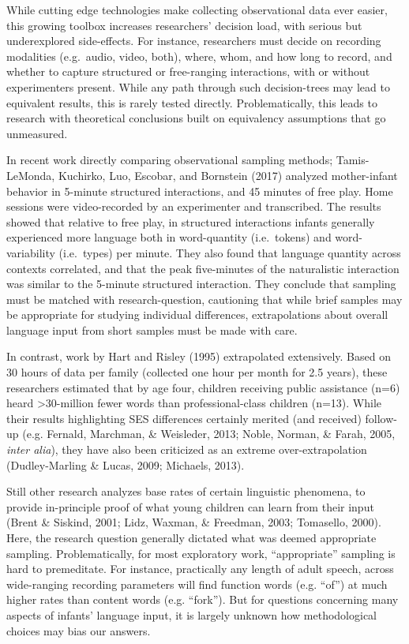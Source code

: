 \documentclass[floatsintext,man]{apa6}
\theoremstyle{definition}
\theoremstyle{definition}
\theoremstyle{definition}
\theoremstyle{remark}
\begin{document}
While cutting edge technologies make collecting observational data ever
easier, this growing toolbox increases researchers' decision load, with
serious but underexplored side-effects. For instance, researchers must
decide on recording modalities (e.g.~audio, video, both), where, whom,
and how long to record, and whether to capture structured or
free-ranging interactions, with or without experimenters present. While
any path through such decision-trees may lead to equivalent results,
this is rarely tested directly. Problematically, this leads to research
with theoretical conclusions built on equivalency assumptions that go
unmeasured.

In recent work directly comparing observational sampling methods;
Tamis-LeMonda, Kuchirko, Luo, Escobar, and Bornstein (2017) analyzed
mother-infant behavior in 5-minute structured interactions, and 45
minutes of free play. Home sessions were video-recorded by an
experimenter and transcribed. The results showed that relative to free
play, in structured interactions infants generally experienced more
language both in word-quantity (i.e.~tokens) and word-variability
(i.e.~types) per minute. They also found that language quantity across
contexts correlated, and that the peak five-minutes of the naturalistic
interaction was similar to the 5-minute structured interaction. They
conclude that sampling must be matched with research-question,
cautioning that while brief samples may be appropriate for studying
individual differences, extrapolations about overall language input from
short samples must be made with care.

In contrast, work by Hart and Risley (1995) extrapolated extensively.
Based on 30 hours of data per family (collected one hour per month for
2.5 years), these researchers estimated that by age four, children
receiving public assistance (n=6) heard \textgreater{}30-million fewer
words than professional-class children (n=13). While their results
highlighting SES differences certainly merited (and received) follow-up
(e.g. Fernald, Marchman, \& Weisleder, 2013; Noble, Norman, \& Farah,
2005, \emph{inter alia}), they have also been criticized as an extreme
over-extrapolation (Dudley-Marling \& Lucas, 2009; Michaels, 2013).

Still other research analyzes base rates of certain linguistic
phenomena, to provide in-principle proof of what young children can
learn from their input (Brent \& Siskind, 2001; Lidz, Waxman, \&
Freedman, 2003; Tomasello, 2000). Here, the research question generally
dictated what was deemed appropriate sampling. Problematically, for most
exploratory work, \enquote{appropriate} sampling is hard to premeditate.
For instance, practically any length of adult speech, across
wide-ranging recording parameters will find function words (e.g.
\enquote{of}) at much higher rates than content words (e.g.
\enquote{fork}). But for questions concerning many aspects of infants'
language input, it is largely unknown how methodological choices may
bias our answers.
\end{document}
